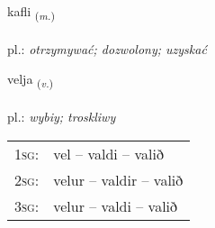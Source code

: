 \documentclass[frontgrid, backgrid]{flacards}\usepackage[]{graphicx}\usepackage[]{xcolor}
\begin{document}
\renewcommand{\blhead}{\vskip5pt {\small\bfseries\footnotesize Nafnorð | Noun }}
\renewcommand{\bcfoot}{\vskip5pt \hspace{2pt}{\small\bfseries\footnotesize 1K}}


{kafli \small{\textsubscript{(\textit{m.})}} \\[1ex] %
\textphonetic{[kʰaplɪ]} \\
pl.: \emph{otrzymywać; dozwolony; uzyskać} \\  [2ex]
\renewcommand*{\arraystretch}{0.8}
}

\renewcommand{\flhead}{\vskip5pt \fboxsep=0pt {\small\bfseries\footnotesize Sagnorð | Verb}}
\renewcommand{\fcfoot}{\vskip5pt \fboxsep=0pt \hspace{2pt}{\small\bfseries\footnotesize 1K}}

\renewcommand{\blhead}{\vskip5pt {\small\bfseries\footnotesize Sagnorð | Verb }}
\renewcommand{\bcfoot}{\vskip5pt \hspace{2pt}{\small\bfseries\footnotesize 1K}}


{velja \small{\textsubscript{(\textit{v.})}} \\[1ex] %
\textphonetic{[vɛlja]} \\
pl.: \emph{wybiy; troskliwy} \\  [2ex]
\renewcommand*{\arraystretch}{0.8}
\begin{tabular}{p{1cm}l}
\textsc{1sg}: & vel -- valdi -- valið \\ 
\textsc{2sg}: & velur -- valdir -- valið \\ 
\textsc{3sg}: & velur -- valdi -- valið \\ 
\end{tabular}
}

\renewcommand{\flhead}{\vskip5pt \fboxsep=0pt {\small\bfseries\footnotesize Nafnorð | Noun}}
\renewcommand{\fcfoot}{\vskip5pt \fboxsep=0pt \hspace{2pt}{\small\bfseries\footnotesize 1K}}
\end{document}
